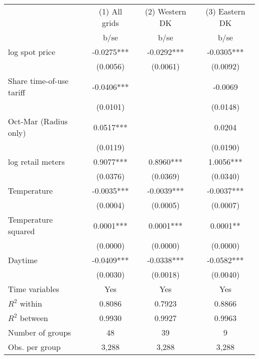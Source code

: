 \begin{tabular}{lccc}\toprule
                    &(1) All grids   &(2) Western DK   &(3) Eastern DK   \\
                    &        b/se   &        b/se   &        b/se   \\
\midrule
log spot price      &     -0.0275***&     -0.0292***&     -0.0305***\\
                    &    (0.0056)   &    (0.0061)   &    (0.0092)   \\
Share time-of-use tariff&     -0.0406***&               &     -0.0069   \\
                    &    (0.0101)   &               &    (0.0148)   \\
Oct-Mar (Radius only)&      0.0517***&               &      0.0204   \\
                    &    (0.0119)   &               &    (0.0190)   \\
log retail meters   &      0.9077***&      0.8960***&      1.0056***\\
                    &    (0.0376)   &    (0.0369)   &    (0.0340)   \\
Temperature         &     -0.0035***&     -0.0039***&     -0.0037***\\
                    &    (0.0004)   &    (0.0005)   &    (0.0007)   \\
Temperature squared &      0.0001***&      0.0001***&      0.0001** \\
                    &    (0.0000)   &    (0.0000)   &    (0.0000)   \\
Daytime             &     -0.0409***&     -0.0338***&     -0.0582***\\
                    &    (0.0030)   &    (0.0018)   &    (0.0040)   \\
Time variables      &         Yes   &         Yes   &         Yes   \\
\midrule
\(R^2\) within      &      0.8086   &      0.7923   &      0.8866   \\
\(R^2\) between     &      0.9930   &      0.9927   &      0.9963   \\
Number of groups    &          48   &          39   &           9   \\
Obs. per group      &       3,288   &       3,288   &       3,288   \\
\bottomrule\end{tabular}
